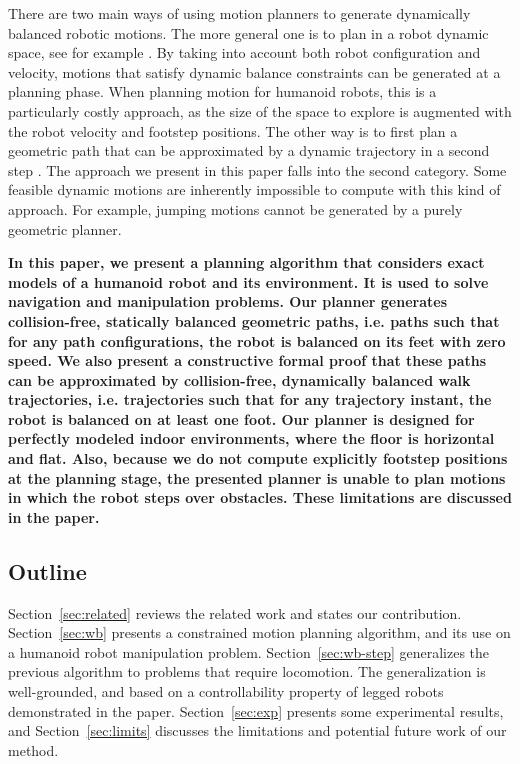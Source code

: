 \documentclass{article}
\begin{document}
There are two main ways of using motion planners to generate dynamically balanced robotic motions.
The more general one is to plan in a robot dynamic space, see for example \cite{shkolnik2011bounding}. 
By taking into account both robot
configuration and velocity, motions that satisfy dynamic balance constraints can be generated
at a planning phase. When planning motion for humanoid robots, this is a particularly costly
approach, as the size of the space to explore is augmented with the robot velocity and footstep
positions. The other way is to first plan  a geometric path that can be approximated by a
dynamic trajectory in a second step \cite{yoshida-humanoids05}. The approach we present in this paper 
falls into the second 
category. Some feasible dynamic motions are inherently impossible to compute with this kind
of approach. For example, jumping motions cannot be generated by a purely geometric planner.

\textbf{In this paper, we present a planning algorithm that considers exact models of a humanoid
robot and its environment. It is used to solve navigation and manipulation problems. Our planner 
generates collision-free, statically balanced
geometric paths, i.e. paths such that for any path configurations, the robot is balanced on its
feet with zero speed. We also present a constructive formal proof that these paths can be
approximated by collision-free, dynamically balanced walk trajectories, i.e. trajectories such
that for any trajectory instant, the robot is balanced on at least one foot. Our planner is designed for perfectly modeled indoor
environments, where the floor is horizontal and flat. Also, because we do not compute explicitly footstep
positions at the planning stage, the presented planner is unable to plan motions in which the
robot steps over obstacles. These limitations are discussed in the paper.}


\subsection{Outline}
Section~\ref{sec:related} reviews the related work and states our contribution. 
Section~\ref{sec:wb} presents a constrained motion planning algorithm, and its
use on a humanoid robot manipulation problem. Section~\ref{sec:wb-step} generalizes
the previous algorithm to problems that require locomotion. The generalization is
well-grounded, and
based on a controllability property of legged robots demonstrated in the paper. 
Section~\ref{sec:exp} presents some experimental results, and 
Section~\ref{sec:limits} discusses the limitations and potential future work of our
method.
\end{document}
